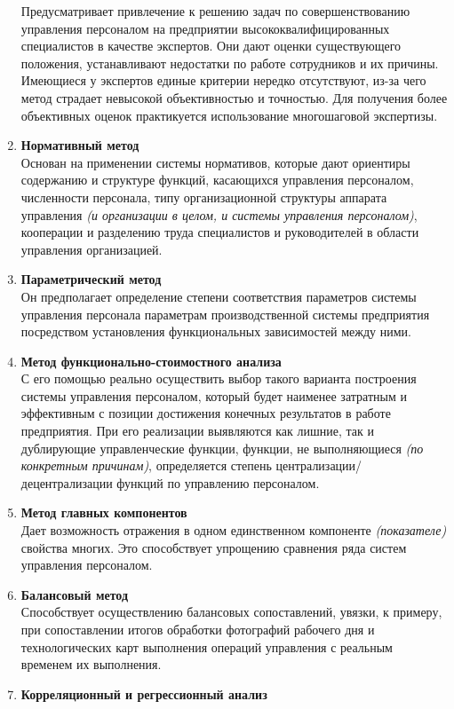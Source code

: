 \documentclass[a4paper,12pt,oneside,final]{extarticle}
\numberwithin{equation}{section}
\begin{document}
\begin{enumerate}
	Предусматривает привлечение к решению задач по совершенствованию управления персоналом на предприятии высококвалифицированных специалистов в качестве экспертов. 
	Они дают оценки существующего положения, устанавливают недостатки по работе сотрудников и их причины.
	Имеющиеся у экспертов единые критерии нередко отсутствуют, из-за чего метод страдает невысокой объективностью и точностью. 
	Для получения более объективных оценок практикуется использование многошаговой экспертизы.
	\item \textbf{Нормативный метод} \\ 
	Основан на применении системы нормативов, которые дают ориентиры содержанию и структуре функций, касающихся управления персоналом, численности персонала, типу организационной структуры аппарата управления \textit{(и организации в целом, и системы управления персоналом)}, кооперации и разделению труда специалистов и руководителей в области управления организацией.
	\item \textbf{Параметрический метод} \\ 
	Он предполагает определение степени соответствия параметров системы управления персонала параметрам производственной системы предприятия посредством установления функциональных зависимостей между ними.
	\item \textbf{Метод функционально-стоимостного анализа} \\ 
	С его помощью реально осуществить выбор такого варианта построения системы управления персоналом, который будет наименее затратным и эффективным с позиции достижения конечных результатов в работе предприятия. 
	При его реализации выявляются как лишние, так и дублирующие управленческие функции, функции, не выполняющиеся \textit{(по конкретным причинам)}, определяется степень централизации/децентрализации функций по управлению персоналом.
	\item \textbf{Метод главных компонентов} \\
	Дает возможность отражения в одном единственном компоненте \textit{(показателе)} свойства многих. 
	Это способствует упрощению сравнения ряда систем управления персоналом.
	\item \textbf{Балансовый метод} \\ 
	Способствует осуществлению балансовых сопоставлений, увязки, к примеру, при сопоставлении итогов обработки фотографий рабочего дня и технологических карт выполнения операций управления с реальным временем их выполнения.
	\item \textbf{Корреляционный и регрессионный анализ} \\ 

\end{enumerate}
\end{document}
